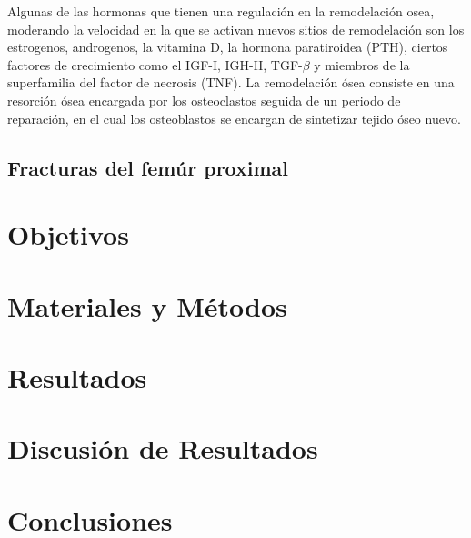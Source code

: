 \documentclass[letterpaper,12pt,oneside]{book}
\begin{document}
    \vspace{10pt} 

    Algunas de las hormonas que tienen una regulación en la remodelación osea, moderando la velocidad en la que se activan nuevos sitios de remodelación son los estrogenos, androgenos, la vitamina D, la hormona paratiroidea (PTH), ciertos factores de crecimiento como el IGF-I, IGH-II, TGF-$\beta$ y miembros de la superfamilia del factor de necrosis (TNF). La remodelación ósea consiste en una resorción ósea encargada por los osteoclastos seguida de un periodo de reparación, en el cual los osteoblastos se encargan de sintetizar tejido óseo nuevo.  

    \vspace{10pt}






    
    


    \section{Fracturas del femúr proximal}

    \chapter{Objetivos}
    \chapter{Materiales y Métodos}

    \chapter{Resultados}
    \chapter{Discusión de Resultados}
    \chapter{Conclusiones}
\end{document}
